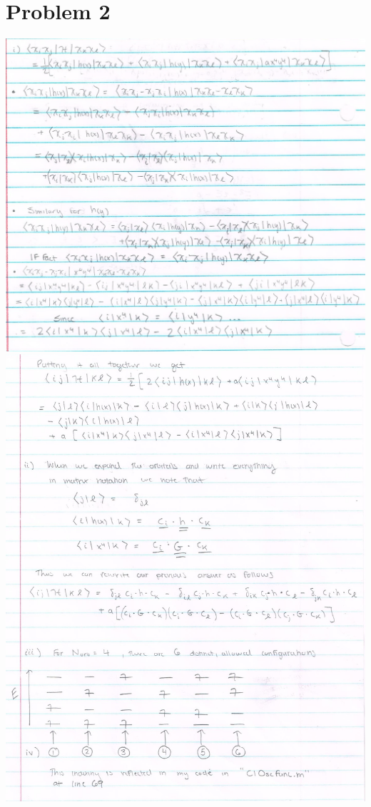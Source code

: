 \documentclass{article}
\begin{document}
\section*{Problem 2}

\begin{center}
\includegraphics[scale=0.75]{prob2_1}\\
\includegraphics[scale=0.75]{prob2_2}
\end{center}
\pagebreak
\end{document}

